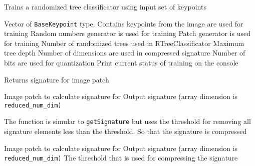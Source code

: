 Trains a randomized tree classificator using input set of keypoints
\begin{description}
 {Vector of \texttt{BaseKeypoint} type. Contains keypoints from the image are used for training}
 {Random numbers generator is used for training}
 {Patch generator is used for training}
 {Number of randomized trees used in RTreeClassificator}
 {Maximum tree depth}
 {Number of dimensions are used in compressed signature}
 {Number of bits are used for quantization}
 {Print current status of training on the console}
\end{description}		

Returns signature for image patch 
\begin{description}
 {Image patch to calculate signature for}
 {Output signature (array dimension is \texttt{reduced\_num\_dim)}}
\end{description}

The function is simular to \texttt{getSignature} but uses the threshold for removing all signature elements less than the threshold. So that the signature is compressed
\begin{description}
 {Image patch to calculate signature for}
 {Output signature (array dimension is \texttt{reduced\_num\_dim)}}
 {The threshold that is used for compressing the signature}
\end{description}

